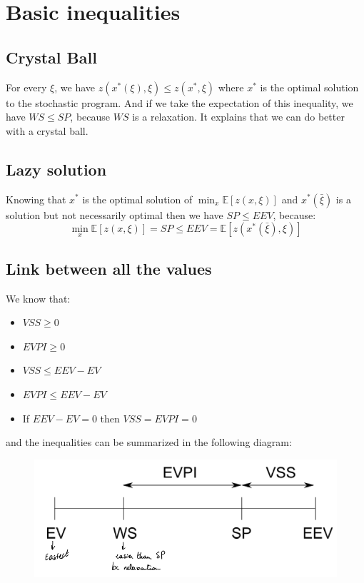 \documentclass[12pt, openany]{report}
\newcommand{\E}{\mathbb{E}}
\theoremstyle{definition}
\begin{document}
\section{Basic inequalities}
\subsection{Crystal Ball}
For every $\xi$, we have $z(x^*(\xi),\xi) \leq z(x^*,\xi)$ where $x^*$ is the optimal solution to the stochastic program. And if we take the expectation of this inequality, we have $WS \leq SP$, because $WS$ is a relaxation. It explains that we can do better with a crystal ball. 
\subsection{Lazy solution}
Knowing that $x^*$ is the optimal solution of $\displaystyle \min_x \E[z(x,\xi)]$ and $x^*(\bar{\xi})$ is a solution but not necessarily optimal then we have $SP \leq EEV$, because:
\begin{equation}
	\displaystyle \min_x \E[z(x,\xi)] = SP \leq EEV = \E[z(x^*(\bar{\xi}),\xi)]
\end{equation}
\subsection{Link between all the values}
We know that:\\
\begin{minipage}{.5\textwidth}
	\begin{itemize}
		\item $VSS \geq 0$
		\item $EVPI \geq 0$
		\item $VSS \leq EEV - EV$
	\end{itemize}
\end{minipage}
\begin{minipage}{.5\textwidth}
	\begin{itemize}
		\item $EVPI \leq EEV -EV$
		\item If $EEV - EV = 0$ then $VSS = EVPI = 0$
	\end{itemize}
\end{minipage}
and the inequalities can be summarized in the following diagram:
\begin{figure}[H]
	\centering
	\includegraphics[scale=0.5]{img/link_ineq.png}
\end{figure}
\end{document}

